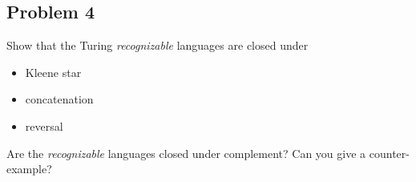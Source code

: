 \documentclass[11pt]{article}
\begin{document}
\subsection{Problem 4}
\label{sec-1-4}
Show that the Turing \emph{recognizable} languages are closed under

\begin{itemize}
\item Kleene star
\item concatenation
\item reversal
\end{itemize}

Are the \emph{recognizable} languages closed under complement? Can you give a counter-example?
\end{document}
